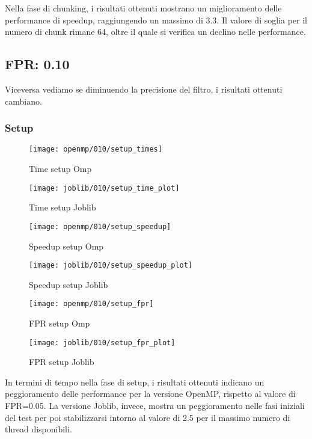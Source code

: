 Nella fase di chunking, i risultati ottenuti mostrano un miglioramento delle performance di speedup, raggiungendo un
massimo di 3.3.
Il valore di soglia per il numero di chunk rimane 64, oltre il quale si verifica un declino nelle performance.

\subsection{FPR: 0.10}\label{subsec:fpr-010}
Viceversa vediamo se diminuendo la precisione del filtro, i risultati ottenuti cambiano.

\subsubsection{Setup}\label{subsubsec:fpr-010-setup}
\begin{figure}[H]
    \centering
    \texttt{[image: openmp/010/setup\_times]}
        \caption{Time setup Omp}\label{fig:010-setup_time_omp}
    \endminipage\hfill
    \texttt{[image: joblib/010/setup\_time\_plot]}
        \caption{Time setup Joblib}\label{fig:010setup_time_joblib}
    \endminipage\hfill
\end{figure}
\begin{figure}[H]
    \centering
    \texttt{[image: openmp/010/setup\_speedup]}
        \caption{Speedup setup Omp}\label{fig:010-setup_speedup_omp}
    \endminipage\hfill
    \texttt{[image: joblib/010/setup\_speedup\_plot]}
        \caption{Speedup setup Joblib}\label{fig:010-setup_speedup_joblib}
    \endminipage\hfill
\end{figure}
\begin{figure}[H]
    \centering
    \texttt{[image: openmp/010/setup\_fpr]}
        \caption{FPR setup Omp}\label{fig:010-setup_fpr_omp}
    \endminipage\hfill
    \texttt{[image: joblib/010/setup\_fpr\_plot]}
        \caption{FPR setup Joblib}\label{fig:010-setup_fpr_joblib}
    \endminipage\hfill
\end{figure}

In termini di tempo nella fase di setup, i risultati ottenuti indicano un peggioramento delle performance per la
versione OpenMP, rispetto al valore di FPR=0.05.
La versione Joblib, invece, mostra un peggioramento nelle fasi iniziali del test per poi stabilizzarsi intorno al
valore di 2.5 per il massimo numero di thread disponibili.

